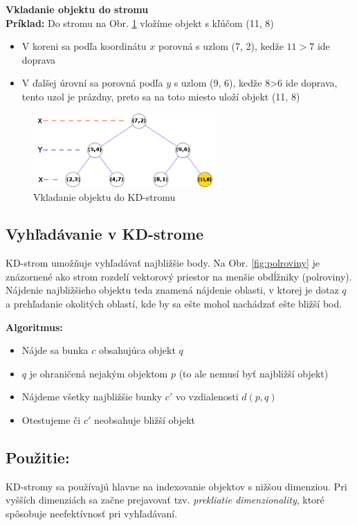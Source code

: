 \documentclass[12pt,a4paper,oneside]{fithesis2}
\begin{document}
\textbf{Vkladanie objektu do stromu} \\
\textbf{Príklad:} Do stromu na Obr. \ref{fig:kdtree} vložíme objekt s kľúčom (11, 8)
\begin{itemize}
\item V koreni sa podľa koordinátu $x$ porovná s uzlom (7, 2), kedže $11>7$ ide doprava
\item V ďalšej úrovní sa porovná podľa $y$ s uzlom (9, 6), kedže 8>6 ide doprava, tento uzol je prázdny, preto sa na toto miesto uloží objekt (11, 8)
\end{itemize}
\begin{figure}[h]
  		\centering
  		\includegraphics[width=7cm]{obr/kdtree01.png}
  		\caption{Vkladanie objektu do KD-stromu}
  		\label{fig:kdtree}
\end{figure}

\subsection{Vyhľadávanie v KD-strome}
KD-strom umožňuje vyhľadávať najbližšie body. Na Obr. \ref{fig:polroviny} je znázornené ako strom rozdelí vektorový priestor na menšie obdĺžniky (polroviny). Nájdenie najbližšieho objektu teda znamená nájdenie oblasti, v ktorej je dotaz $q$ a prehľadanie okolitých oblastí, kde by sa ešte mohol nachádzať ešte bližší bod.

\textbf{Algoritmus:} 
\begin{itemize}
\item Nájde sa bunka $c$ obsahujúca objekt $q$
\item $q$ je ohraničená nejakým objektom $p$ (to ale nemusí byť najbližší objekt)
\item Nájdeme všetky najbližšie bunky $c'$ vo vzdialenosti $d(p,q)$
\item Otestujeme či $c'$ neobsahuje bližší objekt
\end{itemize}

\subsection{Použitie:}
KD-stromy sa používajú hlavne na indexovanie objektov s nižšou dimenziou. Pri vyšších dimenziách sa začne prejavovať tzv. \textit{prekliatie dimenzionality}, ktoré spôsobuje neefektívnosť pri vyhľadávaní.
\end{document}
